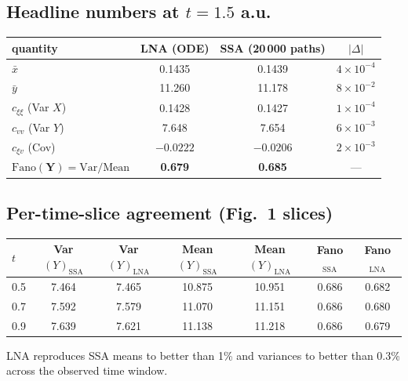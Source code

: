 \documentclass[11pt]{article}
\begin{document}
\subsection{Headline numbers at $t=1.5$ a.u.}
\begin{center}
\begin{tabular}{lccc}\toprule
quantity & LNA (ODE) & SSA (20\,000 paths) & $|\Delta|$ \\ \midrule
$\bar x$ & 0.1435 & 0.1439 & $4\times 10^{-4}$ \\
$\bar y$ & 11.260 & 11.178 & $8\times 10^{-2}$ \\
$c_{\xi\xi}$ (Var $X$) & 0.1428 & 0.1427 & $1\times 10^{-4}$ \\
$c_{vv}$ (Var $Y$) & 7.648 & 7.654 & $6\times 10^{-3}$ \\
$c_{\xi v}$ (Cov) & $-0.0222$ & $-0.0206$ & $2\times 10^{-3}$ \\
$\mathbf{\mathrm{Fano}(Y)=\mathrm{Var}/\mathrm{Mean}}$ & \textbf{0.679} & \textbf{0.685} & --- \\
\bottomrule
\end{tabular}
\end{center}

\subsection{Per-time-slice agreement (Fig.\ 1 slices)}
\begin{center}
\begin{tabular}{lcccccc}\toprule
$t$ & Var$(Y)_\mathrm{SSA}$ & Var$(Y)_\mathrm{LNA}$ & Mean$(Y)_\mathrm{SSA}$ & Mean$(Y)_\mathrm{LNA}$ & Fano$_\mathrm{SSA}$ & Fano$_\mathrm{LNA}$ \\ \midrule
0.5 & 7.464 & 7.465 & 10.875 & 10.951 & 0.686 & 0.682 \\
0.7 & 7.592 & 7.579 & 11.070 & 11.151 & 0.686 & 0.680 \\
0.9 & 7.639 & 7.621 & 11.138 & 11.218 & 0.686 & 0.679 \\
\bottomrule
\end{tabular}
\end{center}
LNA reproduces SSA means to better than 1\% and variances to better than 0.3\% across the observed time window.
\end{document}
